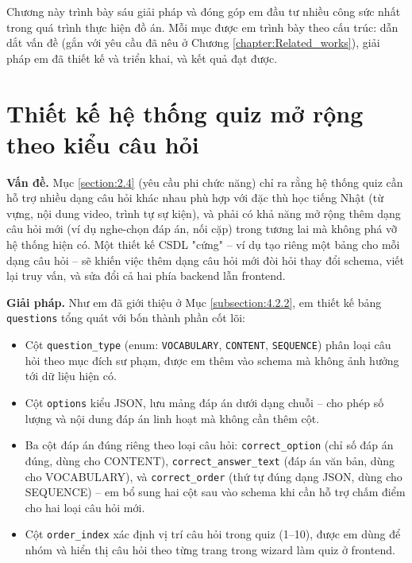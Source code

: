 \documentclass[../DoAn.tex]{subfiles}
\begin{document}
Chương này trình bày sáu giải pháp và đóng góp em đầu tư nhiều công sức nhất trong quá trình thực hiện đồ án. Mỗi mục được em trình bày theo cấu trúc: dẫn dắt vấn đề (gắn với yêu cầu đã nêu ở Chương \ref{chapter:Related_works}), giải pháp em đã thiết kế và triển khai, và kết quả đạt được.

\section{Thiết kế hệ thống quiz mở rộng theo kiểu câu hỏi}
\label{section:5.1}

\textbf{Vấn đề.} Mục \ref{section:2.4} (yêu cầu phi chức năng) chỉ ra rằng hệ thống quiz cần hỗ trợ nhiều dạng câu hỏi khác nhau phù hợp với đặc thù học tiếng Nhật (từ vựng, nội dung video, trình tự sự kiện), và phải có khả năng mở rộng thêm dạng câu hỏi mới (ví dụ nghe-chọn đáp án, nối cặp) trong tương lai mà không phá vỡ hệ thống hiện có. Một thiết kế CSDL "cứng" -- ví dụ tạo riêng một bảng cho mỗi dạng câu hỏi -- sẽ khiến việc thêm dạng câu hỏi mới đòi hỏi thay đổi schema, viết lại truy vấn, và sửa đổi cả hai phía backend lẫn frontend.

\textbf{Giải pháp.} Như em đã giới thiệu ở Mục \ref{subsection:4.2.2}, em thiết kế bảng \texttt{questions} tổng quát với bốn thành phần cốt lõi:

\begin{itemize}
    \item Cột \texttt{question\_type} (enum: \texttt{VOCABULARY}, \texttt{CONTENT}, \texttt{SEQUENCE}) phân loại câu hỏi theo mục đích sư phạm, được em thêm vào schema mà không ảnh hưởng tới dữ liệu hiện có.
    \item Cột \texttt{options} kiểu JSON, lưu mảng đáp án dưới dạng chuỗi -- cho phép số lượng và nội dung đáp án linh hoạt mà không cần thêm cột.
    \item Ba cột đáp án đúng riêng theo loại câu hỏi: \texttt{correct\_option} (chỉ số đáp án đúng, dùng cho CONTENT), \texttt{correct\_answer\_text} (đáp án văn bản, dùng cho VOCABULARY), và \texttt{correct\_order} (thứ tự đúng dạng JSON, dùng cho SEQUENCE) -- em bổ sung hai cột sau vào schema khi cần hỗ trợ chấm điểm cho hai loại câu hỏi mới.
    \item Cột \texttt{order\_index} xác định vị trí câu hỏi trong quiz (1--10), được em dùng để nhóm và hiển thị câu hỏi theo từng trang trong wizard làm quiz ở frontend.
\end{itemize}
\end{document}
